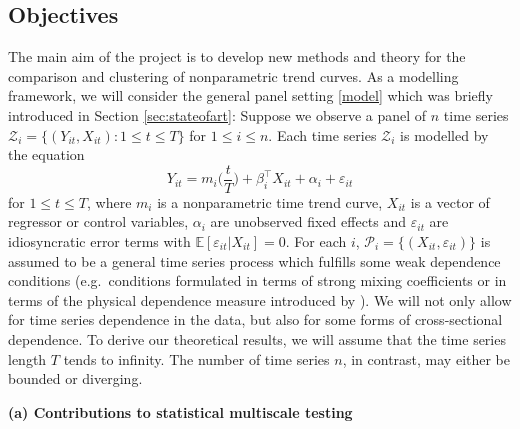 \documentclass[a4paper,12pt]{article}
\begin{document}
\subsection{Objectives}\label{sec:objectives}


The main aim of the project is to develop new methods and theory for the comparison and clustering of nonparametric trend curves. As a modelling framework, we will consider the general panel setting \eqref{model} which was briefly introduced in Section \ref{sec:stateofart}:  Suppose we observe a panel of $n$ time series $\mathcal{Z}_i = \{(Y_{it},X_{it}): 1 \le t \le T\}$ for $ 1 \le i \le n$. Each time series $\mathcal{Z}_i$ is modelled by the equation 
\begin{equation}\label{model-objectives}
Y_{it} = m_i \Big( \frac{t}{T} \Big) + \beta_i^\top X_{it} + \alpha_i + \varepsilon_{it} 
\end{equation}
for $ 1 \le t \le T$, where $m_i$ is a nonparametric time trend curve, $X_{it}$ is a vector of regressor or control variables, $\alpha_i$ are unobserved fixed effects and $\varepsilon_{it}$ are idiosyncratic error terms with $\mathbb{E}[\varepsilon_{it}|X_{it} ] = 0$. For each $i$, $\mathcal{P}_i = \{(X_{it},\varepsilon_{it})\}$ is assumed to be a general time series process which fulfills some weak dependence conditions (e.g.\ conditions formulated in terms of strong mixing coefficients or in terms of the physical dependence measure introduced by \cite{Wu2005}). We will not only allow for time series dependence in the data, but also for some forms of cross-sectional dependence. To derive our theoretical results, we will assume that the time series length $T$ tends to infinity. The number of time series $n$, in contrast, may either be bounded or diverging. 
\vspace{15pt}


\noindent \textbf{(a) Contributions to statistical multiscale testing} 
\vspace{10pt} 
\end{document}
